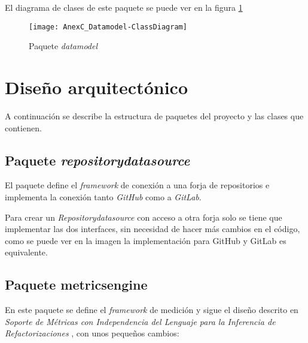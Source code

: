 El diagrama de clases de este paquete se puede ver en la figura \ref{fig:AnexC_Datamodel-ClassDiagram}

\begin{figure}[!h]
	\centering
	\texttt{[image: AnexC\_Datamodel-ClassDiagram]}
	\caption{Paquete \textit{datamodel}}\label{fig:AnexC_Datamodel-ClassDiagram}
\end{figure}
\FloatBarrier
	
\section{Diseño arquitectónico}
A continuación se describe la estructura de paquetes del proyecto y las clases que contienen.

\subsection{Paquete \textit{repositorydatasource}}
El paquete define el \textit{framework} de conexión a una forja de repositorios e implementa la conexión tanto \textit{GitHub} como a \textit{GitLab}.


Para crear un \textit{Repositorydatasource} con acceso a otra forja solo se tiene que implementar las dos interfaces, sin necesidad de hacer más cambios en el código, como se puede ver en la imagen la implementación para GitHub y GitLab es equivalente.

\subsection{Paquete metricsengine}
En este paquete se define el \textit{framework} de medición y sigue el diseño descrito en \textit{Soporte de Métricas con Independencia del Lenguaje para la Inferencia de Refactorizaciones} \cite{marticorena_sanchez_soporte_2005}, con unos pequeños cambios:

